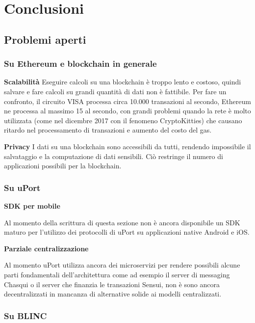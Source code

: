 \chapter{Conclusioni}

\section{Problemi aperti}

\subsection{Su Ethereum e blockchain in generale}

\textbf{Scalabilità}
Eseguire calcoli su una blockchain è troppo lento e costoso, quindi salvare e fare calcoli
su grandi quantità di dati non è fattibile. Per fare un confronto, il circuito VISA processa circa 10.000 transazioni al secondo,
Ethereum ne processa al massimo 15 al secondo, con grandi problemi quando
la rete è molto utilizzata (come nel dicembre 2017 con il fenomeno CryptoKitties)
che causano ritardo nel processamento di transazioni e aumento del costo del gas.

\textbf{Privacy}
I dati su una blockchain sono accessibili da tutti, rendendo impossibile il salvataggio e la computazione di dati sensibili.
Ciò restringe il numero di applicazioni possibili per la blockchain.

\subsection{Su uPort}

\textbf{SDK per mobile}

Al momento della scrittura di questa sezione non è ancora disponibile un SDK maturo
per l’utilizzo dei protocolli di uPort su applicazioni native Android e iOS.

\textbf{Parziale centralizzazione}

Al momento uPort utilizza ancora dei microservizi per rendere possibili alcune parti fondamentali
dell’architettura come ad esempio il server di messaging Chasqui o il server che finanzia le transazioni Sensui,
non è sono ancora decentralizzati in mancanza di alternative solide ai modelli centralizzati.

\subsection{Su BLINC}

